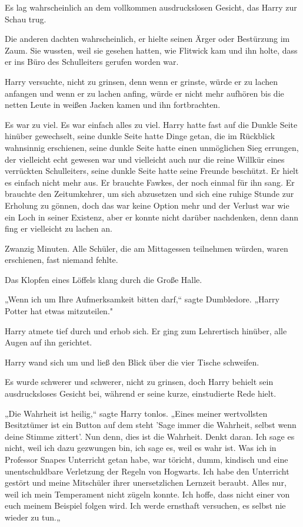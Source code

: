 {Es lag wahrscheinlich an dem vollkommen ausdruckslosen Gesicht, das Harry zur Schau trug.

Die anderen dachten wahrscheinlich, er hielte seinen Ärger oder Bestürzung im Zaum. Sie wussten, weil sie gesehen hatten, wie Flitwick kam und ihn holte, dass er ins Büro des Schulleiters gerufen worden war.

Harry versuchte, nicht zu grinsen, denn wenn er grinste, würde er zu lachen anfangen und wenn er zu lachen anfing, würde er nicht mehr aufhören bis die netten Leute in weißen Jacken kamen und ihn fortbrachten.

Es war zu viel. Es war einfach alles zu viel. Harry hatte fast auf die Dunkle Seite hinüber gewechselt, seine dunkle Seite hatte Dinge getan, die im Rückblick wahnsinnig erschienen, seine dunkle Seite hatte einen unmöglichen Sieg errungen, der vielleicht echt gewesen war und vielleicht auch nur die reine Willkür eines verrückten Schulleiters, seine dunkle Seite hatte seine Freunde beschützt. Er hielt es einfach nicht mehr aus. Er brauchte Fawkes, der noch einmal für ihn sang. Er brauchte den Zeitumkehrer, um sich abzusetzen und sich eine ruhige Stunde zur Erholung zu gönnen, doch das war keine Option mehr und der Verlust war wie ein Loch in seiner Existenz, aber er konnte nicht darüber nachdenken, denn dann fing er vielleicht zu lachen an.

Zwanzig Minuten. Alle Schüler, die am Mittagessen teilnehmen würden, waren erschienen, fast niemand fehlte.

Das Klopfen eines Löffels klang durch die Große Halle.

„Wenn ich um Ihre Aufmerksamkeit bitten darf,“ sagte Dumbledore. „Harry Potter hat etwas mitzuteilen."

Harry atmete tief durch und erhob sich. Er ging zum Lehrertisch hinüber, alle Augen auf ihn gerichtet.

Harry wand sich um und ließ den Blick über die vier Tische schweifen.

Es wurde schwerer und schwerer, nicht zu grinsen, doch Harry behielt sein ausdrucksloses Gesicht bei, während er seine kurze, einstudierte Rede hielt.

„Die Wahrheit ist heilig,“ sagte Harry tonlos. „Eines meiner wertvollsten Besitztümer ist ein Button auf dem steht 'Sage immer die Wahrheit, selbst wenn deine Stimme zittert'. Nun denn, dies ist die Wahrheit. Denkt daran. Ich sage es nicht, weil ich dazu gezwungen bin, ich sage es, weil es wahr ist. Was ich in Professor Snapes Unterricht getan habe, war töricht, dumm, kindisch und eine unentschuldbare Verletzung der Regeln von Hogwarts. Ich habe den Unterricht gestört und meine Mitschüler ihrer unersetzlichen Lernzeit beraubt. Alles nur, weil ich mein Temperament nicht zügeln konnte. Ich hoffe, dass nicht einer von euch meinem Beispiel folgen wird. Ich werde ernsthaft versuchen, es selbst nie wieder zu tun.„

}
